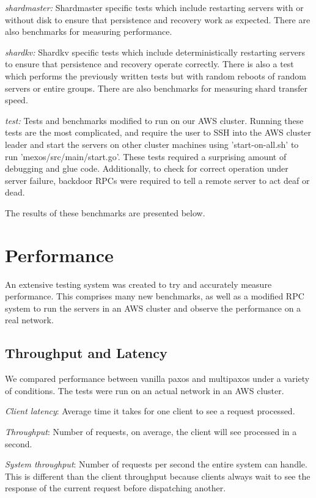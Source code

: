 \documentclass[letterpaper,10pt]{article}
\begin{document}
\emph{shardmaster:} Shardmaster specific tests which include restarting servers with or without disk to ensure that persistence and recovery work as expected.  There are also benchmarks for measuring performance.

\emph{shardkv:} Shardkv specific tests which include deterministically restarting servers to ensure that persistence and recovery operate correctly.  There is also a test which performs the previously written tests but with random reboots of random servers or entire groups.  There are also benchmarks for measuring shard transfer speed.

\emph{test:} Tests and benchmarks modified to run on our AWS cluster.  Running these tests are the most complicated, and require the user to SSH into the AWS cluster leader and start the servers on other cluster machines using 'start-on-all.sh' to run 'mexos/src/main/start.go'. These tests required a surprising amount of debugging and glue code.  Additionally, to check for correct operation under server failure, backdoor RPCs were required to tell a remote server to act deaf or dead.

The results of these benchmarks are presented below.

\section{Performance}

An extensive testing system was created to try and accurately measure performance.  This comprises many new benchmarks, as well as a modified RPC system to run the servers in an AWS cluster and observe the performance on a real network.

\subsection{Throughput and Latency}

We compared performance between vanilla paxos and multipaxos under a variety of conditions. The tests were run on an actual network in an AWS cluster. 

\textit{Client latency}: Average time it takes for one client to see a
request processed. 

\textit{Throughput}: Number of requests, on average, the
client will see processed in a second.

\textit{System throughput}: Number of requests per second the entire
system can handle. This is different than the client throughput
because clients always wait to see the response of the current request
before dispatching another.
\end{document}
